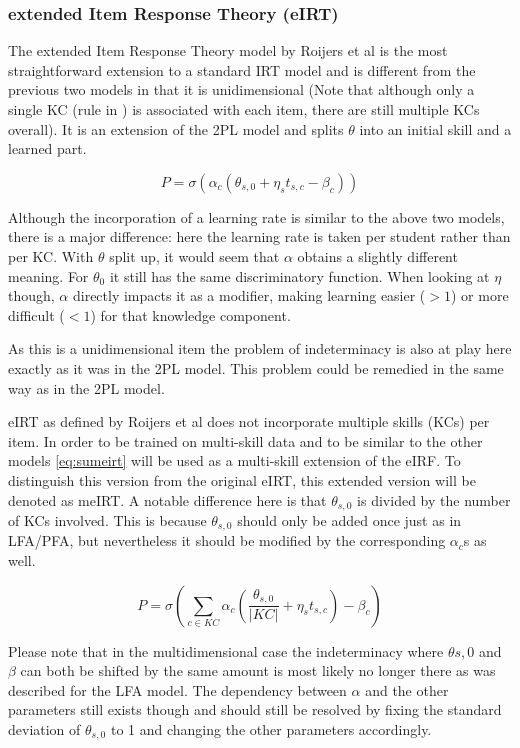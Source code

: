 \documentclass{scrartcl}
\begin{document}
\subsubsection{extended Item Response Theory (eIRT)}
\label{sec:eirt}
The extended Item Response Theory model by Roijers et al \cite{eirt} is the most straightforward extension to a standard IRT model and is different from the previous two models in that it is unidimensional (Note that although only a single KC (rule in \cite{eirt}) is associated with each item, there are still multiple KCs overall).  It is an extension of the 2PL model and splits $\theta$ into an initial skill and a learned part. 

\begin{equation}
\label{eq:eirt}
P = \sigma(\alpha_{c} (\theta_{s,0} + \eta_{s} t_{s,c} - \beta_{c}))
\end{equation}

Although the incorporation of a learning rate is similar to the above two models, there is a major difference: here the learning rate is taken per student rather than per KC. With $\theta$ split up, it would seem that $\alpha$ obtains a slightly different meaning. For $\theta_{0}$ it still has the same discriminatory function. When looking at $\eta$ though, $\alpha$ directly impacts it as a modifier, making learning easier ($>1$) or more difficult ($<1$) for that knowledge component.

As this is a unidimensional item the problem of indeterminacy is also at play here exactly as it was in the 2PL model. This problem could be remedied in the same way as in the 2PL model.

eIRT as defined by Roijers et al does not incorporate multiple skills (KCs) per item. In order to be trained on multi-skill data and to be similar to the other models \ref{eq:sumeirt} will be used as a multi-skill extension of the eIRF. To distinguish this version from the original eIRT, this extended version will be denoted as meIRT. A notable difference here is that $\theta_{s,0}$ is divided by the number of KCs involved. This is because $\theta_{s,0}$ should only be added once just as in LFA/PFA, but nevertheless it should be modified by the corresponding $\alpha_{c}$s as well.

\begin{equation}
\label{eq:sumeirt}
P = \sigma(\sum_{c \in KC} \alpha_{c}(\frac{\theta_{s,0}}{|KC|} + \eta_{s} t_{s,c}) - \beta_{c})
\end{equation}

Please note that in the multidimensional case the indeterminacy where $\theta{s,0}$ and $\beta$ can both be shifted by the same amount is most likely no longer there as was described for the LFA model. The dependency between $\alpha$ and the other parameters still exists though and should still be resolved by fixing the standard deviation of $\theta_{s,0}$ to 1 and changing the other parameters accordingly.
\end{document}
